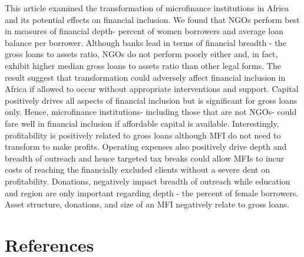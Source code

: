 \documentclass[
]{article}
\begin{document}
This article examined the transformation of microfinance institutions in
Africa and its potential effects on financial inclusion. We found that
NGOs perform best in measures of financial depth- percent of women
borrowers and average loan balance per borrower. Although banks lead in
terms of financial breadth - the gross loans to assets ratio, NGOs do
not perform poorly either and, in fact, exhibit higher median gross
loans to assets ratio than other legal forms. The result suggest that
transformation could adversely affect financial inclusion in Africa if
allowed to occur without appropriate interventions and support. Capital
positively drives all aspects of financial inclusion but is significant
for gross loans only. Hence, microfinance institutions- including those
that are not NGOs- could fare well in financial inclusion if affordable
capital is available. Interestingly, profitability is positively related
to gross loans although MFI do not need to transform to make profits.
Operating expenses also positively drive depth and breadth of outreach
and hence targeted tax breaks could allow MFIs to incur costs of
reaching the financially excluded clients without a severe dent on
profitability. Donations, negatively impact breadth of outreach while
education and region are only important regarding depth - the percent of
female borrowers. Asset structure, donations, and size of an MFI
negatively relate to gross loans.

\hypertarget{references}{%
\section{\texorpdfstring{\textbf{References}}{References}}\label{references}}
\end{document}
